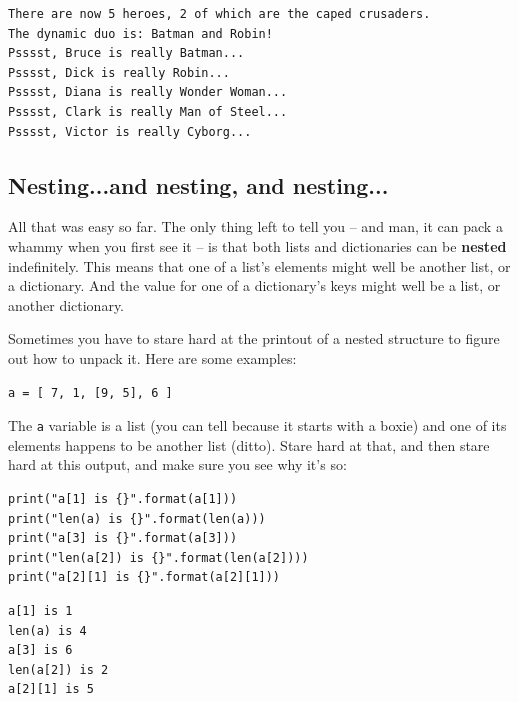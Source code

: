 \begin{Verbatim}[fontsize=\small,samepage=true,frame=leftline,framesep=5mm,framerule=1mm]
There are now 5 heroes, 2 of which are the caped crusaders.
The dynamic duo is: Batman and Robin!
Psssst, Bruce is really Batman...
Psssst, Dick is really Robin...
Psssst, Diana is really Wonder Woman...
Psssst, Clark is really Man of Steel...
Psssst, Victor is really Cyborg...
\end{Verbatim}

\subsection{Nesting...and nesting, and nesting...}


All that was easy so far. The only thing left to tell you -- and man, it can
pack a whammy when you first see it -- is that both lists and dictionaries can
be \textbf{nested} indefinitely. This means that one of a list's elements might
well be another list, or a dictionary. And the value for one of a dictionary's
keys might well be a list, or another dictionary.

Sometimes you have to stare hard at the printout of a nested structure to
figure out how to unpack it. Here are some examples:

\begin{Verbatim}[fontsize=\small,samepage=true,frame=single,framesep=3mm]
a = [ 7, 1, [9, 5], 6 ]
\end{Verbatim}


The \texttt{a} variable is a list (you can tell because it starts with a boxie)
and one of its elements happens to be another list (ditto). Stare hard at that,
and then stare hard at this output, and make sure you see why it's so:

\begin{Verbatim}[fontsize=\small,samepage=true,frame=single,framesep=3mm]
print("a[1] is {}".format(a[1]))
print("len(a) is {}".format(len(a)))
print("a[3] is {}".format(a[3]))
print("len(a[2]) is {}".format(len(a[2])))
print("a[2][1] is {}".format(a[2][1]))
\end{Verbatim}
\vspace{-.2in}

\begin{Verbatim}[fontsize=\small,samepage=true,frame=single,framesep=3mm]
a[1] is 1
len(a) is 4
a[3] is 6
len(a[2]) is 2
a[2][1] is 5
\end{Verbatim}

